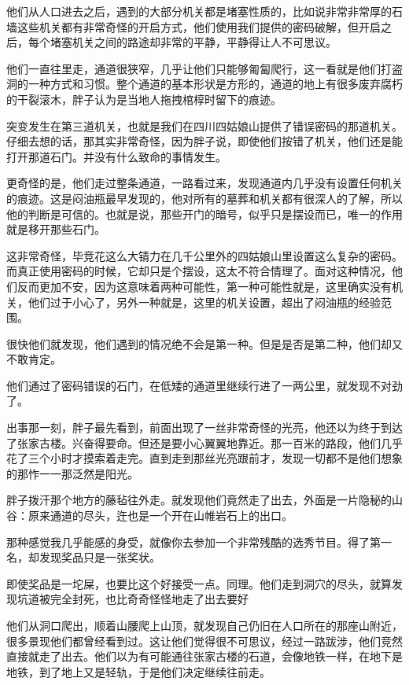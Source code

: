 他们从人口进去之后，遇到的大部分机关都是堵塞性质的，比如说非常非常厚的石墙这些机关都有非常奇怪的开启方式，他们使用我们提供的密码破解，但开启之后，每个堵塞机关之间的路途却非常的平静，平静得让人不可思议。

他们一直往里走，通道很狭窄，几乎让他们只能够匍匐爬行，这一看就是他们打盗洞的一种方式和习惯。整个通道的基本形状是方形的，通道的地上有很多废弃腐朽的干裂滚木，胖子认为是当地人拖拽棺椁时留下的痕迹。

突变发生在第三道机关，也就是我们在四川四姑娘山提供了错误密码的那道机关。仔细去想的话，那其实非常奇怪，因为胖子说，即使他们按错了机关，他们还是能打开那道石门。并没有什么致命的事情发生。

更奇怪的是，他们走过整条通道，一路看过来，发现通道内几乎没有设置任何机关的痕迹。这是闷油瓶最早发现的，他对所有的墓葬和机关都有很深人的了解，所以他的判断是可信的。也就是说，那些开门的暗号，似乎只是摆设而已，唯一的作用就是移开那些石门。

这非常奇怪，毕竞花这么大锖力在几千公里外的四姑娘山里设置这么复杂的密码。而真正使用密码的时候，它却只是个摆设，这太不符合情理了。面对这种情况，他们反而更加不安，因为这意味着两种可能性，第一种可能性就是，这里确实没有机关，他们过于小心了，另外一种就是，这里的机关设置，超出了闷油瓶的经验范围。

很快他们就发现，他们遇到的情况绝不会是第一种。但是是否是第二种，他们却又不敢肯定。

他们通过了密码错误的石门，在低矮的通道里继续行进了一两公里，就发现不对劲了。

出事那一刻，胖子最先看到，前面出现了一丝非常奇怪的光亮，他还以为终于到达了张家古楼。兴奋得要命。但还是要小心翼翼地靠近。那一百米的路段，他们几乎花了三个小时才摸索着走完。直到走到那丝光亮跟前才，发现一切都不是他们想象的那怍一一那泛然是阳光。

胖子拨汗那个地方的藤毡往外走。就发现他们竟然走了出去，外面是一片隐秘的山谷：原来通道的尽头，迕也是一个开在山帷岩石上的出口。

那种感觉我几乎能感的身受，就像你去参加一个非常残酷的选秀节目。得了第一名，却发现奖品只是一张奖状。

即使奖品是一坨屎，也要比这个好接受一点。同理。他们走到洞穴的尽头，就算发现坑道被完全封死，也比奇奇怪怪地走了出去要好

他们从洞口爬出，顺着山腰爬上山顶，就发现自己仍旧在人口所在的那座山附近，很多景现他们都曾经看到过。这让他们觉得很不可思议，经过一路跋涉，他们竞然直接就走了出去。他们以为有可能通往张家古楼的石道，会像地铁一样，在地下是地铁，到了地上又是轻轨，于是他们决定继续往前走。

